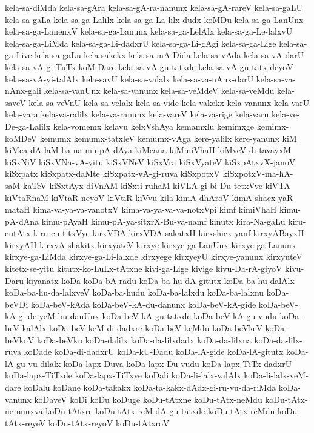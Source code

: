 {kela-sa-diMda
kela-sa-gAra
kela-sa-gA-ra-nanunx
kela-sa-gA-rareV
kela-sa-gaLU
kela-sa-gaLa
kela-sa-ga-Lalilx
kela-sa-ga-La-lilx-dudx-koMDu
kela-sa-ga-LanUnx
kela-sa-ga-LanenxV
kela-sa-ga-Lanunx
kela-sa-ga-LelAlx
kela-sa-ga-Le-lalxvU
kela-sa-ga-LiMda
kela-sa-ga-Li-dadxrU
kela-sa-ga-Li-gAgi
kela-sa-ga-Lige
kela-sa-ga-Live
kela-sa-gaLu
kela-sakekx
kela-sa-mA-Dida
kela-sa-vAda
kela-sa-vA-darU
kela-sa-vA-gi-TuTx-koM-Dare
kela-sa-vA-gu-tatxde
kela-sa-vA-gu-tatx-deyoV
kela-sa-vA-yi-talAlx
kela-savU
kela-sa-valalx
kela-sa-va-nAnx-darU
kela-sa-va-nAnx-gali
kela-sa-vanUnx
kela-sa-vanunx
kela-sa-veMdeV
kela-sa-veMdu
kela-saveV
kela-sa-veVnU
kela-sa-velalx
kela-sa-vide
kela-vakekx
kela-vanunx
kela-varU
kela-vara
kela-va-ralilx
kela-va-ranunx
kela-vareV
kela-va-rige
kela-varu
kela-ve-De-ga-Lalilx
kela-vomemx
kelavu
kelxVshAya
kemamxlu
kemimxge
kemimx-koMDeV
kemumx
kemumx-tatxleV
kemumx-vAga
kere-yalilx
kere-yanunx
kiM
kiMca-dA-laM-ba-na-mu-pA-dAya
kiMcana
kiMmiVhaH
kiMveV-di-tavayxM
kiSxNiV
kiSxVNa-vA-yitu
kiSxVNeV
kiSxVra
kiSxVyateV
kiSxpAtxvX-janoV
kiSxpatx
kiSxpatx-daMte
kiSxpatx-vA-gi-ruva
kiSxpotxV
kiSxpotxV-ma-hA-saM-kaTeV
kiSxtAyx-diVnAM
kiSxti-ruhaM
kiVLA-gi-bi-Du-tetxVve
kiVTA
kiVtaRnaM
kiVtaR-neyoV
kiVtiR
kiVvu
kila
kimA-dhAroV
kimA-shacx-yaR-mataH
kima-va-ya-va-vanotxV
kima-va-ya-va-va-notxVpi
kimf
kimiVhaH
kimu-pA-dAna
kimu-pAyaH
kimu-pA-ya-sitxrX-Bu-va-namf
kinutx
kira-Na-gaLu
kiru-cutAtx
kiru-cu-titxVye
kirxVDA
kirxVDA-sakatxH
kirxshicx-yanf
kirxyABayxH
kirxyAH
kirxyA-shakitx
kirxyateV
kirxye
kirxye-ga-LanUnx
kirxye-ga-Lanunx
kirxye-ga-LiMda
kirxye-ga-Li-lalxde
kirxyege
kirxyeyU
kirxye-yanunx
kirxyuteV
kitetx-se-yitu
kitutx-ko-LuLx-tAtxne
kivi-ga-Lige
kivige
kivu-Da-rA-giyoV
kivu-Daru
kiyanatx
koDa
koDa-bA-radu
koDa-ba-hu-dA-gitutx
koDa-ba-hu-dalAlx
koDa-ba-hu-da-lalxveV
koDa-ba-hudu
koDa-ba-lalxdu
koDa-ba-lalxnu
koDa-beVDi
koDa-beV-kAda
koDa-beV-kA-du-danunx
koDa-beV-kA-gide
koDa-beV-kA-gi-de-yeM-bu-danUnx
koDa-beV-kA-gu-tatxde
koDa-beV-kA-gu-vudu
koDa-beV-kalAlx
koDa-beV-keM-di-dadxre
koDa-beV-keMdu
koDa-beVkeV
koDa-beVkoV
koDa-beVku
koDa-dalilx
koDa-da-lilxdadx
koDa-da-lilxna
koDa-da-lilx-ruva
koDade
koDa-di-dadxrU
koDa-kU-Dadu
koDa-lA-gide
koDa-lA-gitutx
koDa-lA-gu-vu-dilalx
koDa-lapx-Duva
koDa-lapx-Du-vudu
koDa-lapx-TiTx-dadxrU
koDa-lapx-TiTxde
koDa-lapx-TiTxve
koDali
koDa-li-lalx-valAlx
koDa-li-lalx-veM-dare
koDalu
koDane
koDa-takakx
koDa-ta-kakx-dAdx-gi-ru-vu-da-riMda
koDa-vanunx
koDaveV
koDi
koDu
koDuge
koDu-tAtxne
koDu-tAtx-neMdu
koDu-tAtx-ne-nunxva
koDu-tAtxre
koDu-tAtx-reM-dA-gu-tatxde
koDu-tAtx-reMdu
koDu-tAtx-reyeV
koDu-tAtx-reyoV
koDu-tAtxroV
}
